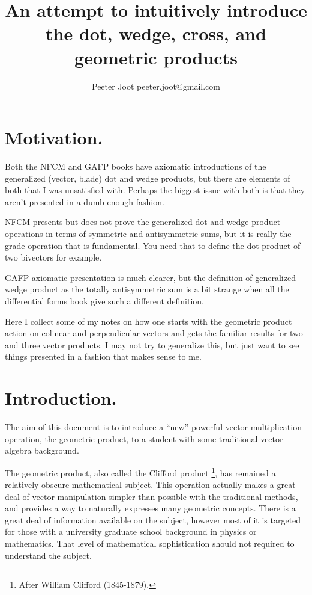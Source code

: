 \documentclass{article}      %
\title{
An attempt to intuitively introduce the dot, wedge, cross, and geometric products
}
\author{Peeter Joot \quad peeter.joot@gmail.com}
\begin{document}
\maketitle{}

\section{ Motivation. }

Both the NFCM and GAFP books have axiomatic introductions of the 
generalized (vector, blade) dot and wedge products, but there are
elements of both that I was unsatisfied with.  Perhaps the biggest
issue with both is that they aren't presented in a dumb enough fashion.

NFCM presents but
does not prove the generalized dot and wedge product operations
in terms of symmetric and antisymmetric sums, but it is really the
grade operation that is fundamental.  You need that to define the
dot product of two bivectors for example.

GAFP axiomatic presentation is much clearer, but the definition of
generalized wedge product as the totally antisymmetric sum is a bit
strange when all the differential forms book give such a different
definition.

Here I collect some of my notes on how one starts with the geometric
product action on colinear and perpendicular vectors and gets the 
familiar results for two and three vector products.  I may not try to
generalize this, but just want to see things presented in a fashion
that makes sense to me.

\section{Introduction.}

The aim of this document is to introduce a ``new'' powerful vector multiplication operation, the geometric product,
to a student with some traditional vector algebra background.

The geometric product, also called the Clifford product 
\footnote{After William Clifford (1845-1879).}, has remained a relatively obscure mathematical subject. 
This operation actually makes a great deal of vector manipulation simpler than possible with the traditional methods, and
provides a way to naturally expresses many geometric concepts.
There is a great deal of information available on the subject, however most of it is targeted for those with a 
university graduate school background in physics or mathematics.  That level of mathematical sophistication
should not required to understand the subject.
\end{document}

